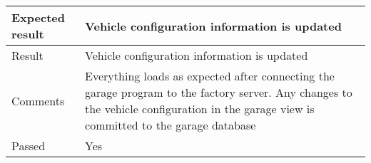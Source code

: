 \begin{table}[H]
\begin{tabularx}{1.0\textwidth}{
    |p{}     %
    |p{}|    %
}
Expected result
& Vehicle configuration information is updated
\\
\hline

Result
& Vehicle configuration information is updated
\\
\hline

Comments
& Everything loads as expected after connecting the garage program to the factory server. Any changes to the vehicle configuration in the garage view is committed to the garage database
\\
\hline

Passed
& Yes
\\
\hline

\end{tabularx}
\end{table}


